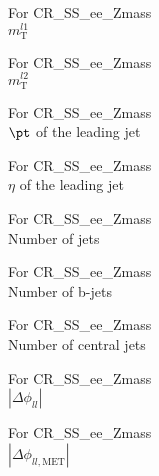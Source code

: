 \begin{frame}{For CR\_SS\_ee\_Zmass \\ $m_{\text{T}}^{l1}$}
\end{frame}

\begin{frame}{For CR\_SS\_ee\_Zmass \\ $m_{\text{T}}^{l2}$}
\end{frame}

\begin{frame}{For CR\_SS\_ee\_Zmass \\ $\pt$ of the leading jet}
\end{frame}

\begin{frame}{For CR\_SS\_ee\_Zmass \\ $\eta$ of the leading jet}
\end{frame}

\begin{frame}{For CR\_SS\_ee\_Zmass \\ Number of jets}
\end{frame}

\begin{frame}{For CR\_SS\_ee\_Zmass \\ Number of b-jets}
\end{frame}

\begin{frame}{For CR\_SS\_ee\_Zmass \\ Number of central jets}
\end{frame}

\begin{frame}{For CR\_SS\_ee\_Zmass \\ $|\Delta\phi_{ll}|$}
\end{frame}

\begin{frame}{For CR\_SS\_ee\_Zmass \\ $|\Delta\phi_{ll,\text{MET}}|$}
\end{frame}

